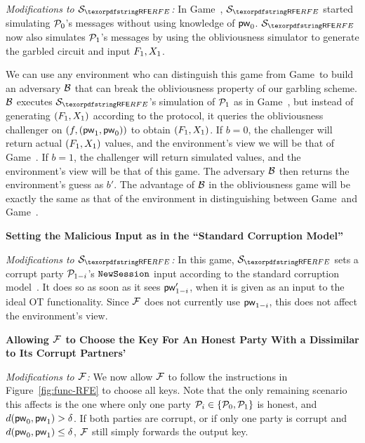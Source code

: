 \begin{games}
\textit{Modifications to $\SimYGCRFE$:}
In Game~\previousgame, $\SimYGCRFE$ started simulating $\mathcal{P}_{0}$'s messages without using knowledge of $\mathsf{pw}_{0}$.
$\SimYGCRFE$ now also simulates $\mathcal{P}_{1}$'s messages by using the obliviousness simulator to generate the garbled circuit and input $F_{1}, X_{1}$.

We can use any environment who can distinguish this game from Game~\previousgame to build an adversary $\mathcal{B}$ that can break the obliviousness property %
of our garbling scheme.
$\mathcal{B}$ executes $\SimYGCRFE$'s simulation of $\mathcal{P}_{1}$ as in Game~\previousgame, but instead of generating $(F_{1}, X_{1})$ according to the protocol, it queries the obliviousness challenger on $(f, (\mathsf{pw}_{1}, \mathsf{pw}_{0}))$ to obtain $(F_{1}, X_{1})$.
If $b = 0$, the challenger will return actual $(F_{1}, X_{1})$ values, and the environment's view we will be that of Game~\previousgame.
If $b = 1$, the challenger will return simulated values, and the environment's view will be that of this game.
The adversary $\mathcal{B}$ then returns the environment's guess as $b'$.
The advantage of $\mathcal{B}$ in the obliviousness game will be exactly the same as that of the environment in distinguishing between Game~\previousgame and Game~\thisgame.

\textbf{Setting the Malicious Input as in the ``Standard Corruption Model''}

\textit{Modifications to $\SimYGCRFE$:}
In this game, $\SimYGCRFE$ sets a corrupt party $\mathcal{P}_{1-i}$'s $\texttt{NewSession}$ input according to the standard corruption model~\cite{FOCS:Canetti01}.
It does so as soon as it sees $\mathsf{pw}_{1-i}'$, when it is given as an input to the ideal OT functionality. 
Since $\mathcal{F}$ does not currently use $\mathsf{pw}_{1-i}$, this does not affect the environment's view.

\textbf{Allowing $\mathcal{F}$ to Choose the Key For An Honest Party With a \Password Dissimilar to Its Corrupt Partners'}

\textit{Modifications to $\mathcal{F}$:}
We now allow $\mathcal{F}$ to follow the instructions in Figure~\ref{fig:func-RFE} to choose all keys.
Note that the only remaining scenario this affects is the one where only one party $\mathcal{P}_{i} \in \{\mathcal{P}_{0}, \mathcal{P}_{1}\}$ is honest, and $d(\mathsf{pw}_{0}, \mathsf{pw}_{1}) > \delta$.
If both parties are corrupt, or if only one party is corrupt and $d(\mathsf{pw}_{0}, \mathsf{pw}_{1}) \leq \delta$, $\mathcal{F}$ still simply forwards the output key.


\end{games}
